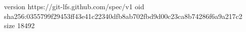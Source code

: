 version https://git-lfs.github.com/spec/v1
oid sha256:0355799f29453ff43e41c22340dfb8ab702fbd9d00c23ca8b74286f6a9a217c2
size 18492
